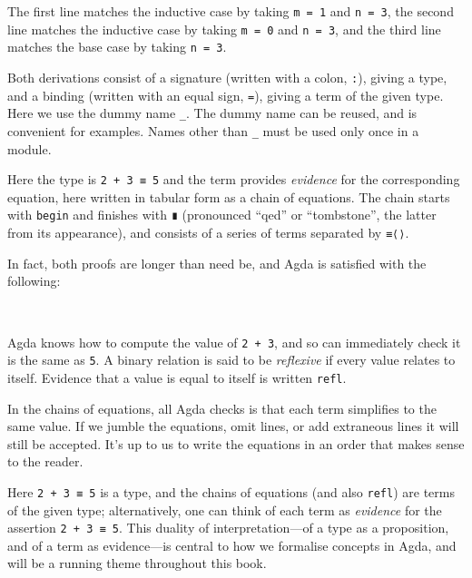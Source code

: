 The first line matches the inductive case by taking \texttt{m\ =\ 1} and
\texttt{n\ =\ 3}, the second line matches the inductive case by taking
\texttt{m\ =\ 0} and \texttt{n\ =\ 3}, and the third line matches the
base case by taking \texttt{n\ =\ 3}.

Both derivations consist of a signature (written with a colon,
\texttt{:}), giving a type, and a binding (written with an equal sign,
\texttt{=}), giving a term of the given type. Here we use the dummy name
\texttt{\_}. The dummy name can be reused, and is convenient for
examples. Names other than \texttt{\_} must be used only once in a
module.

Here the type is \texttt{2\ +\ 3\ ≡\ 5} and the term provides
\emph{evidence} for the corresponding equation, here written in tabular
form as a chain of equations. The chain starts with \texttt{begin} and
finishes with \texttt{∎} (pronounced ``qed'' or ``tombstone'', the
latter from its appearance), and consists of a series of terms separated
by \texttt{≡⟨⟩}.

In fact, both proofs are longer than need be, and Agda is satisfied with
the following:

\begin{fence}
\begin{code}%
\>[0]\AgdaFunction{\AgdaUnderscore{}}\AgdaSpace{}%
\AgdaSymbol{:}\AgdaSpace{}%
\AgdaSpace{}%
\AgdaOperator{\AgdaFunction{+}}\AgdaSpace{}%
\AgdaSpace{}%
\AgdaSpace{}%
\<%
\\
\>[0]\AgdaSymbol{\AgdaUnderscore{}}\AgdaSpace{}%
\AgdaSymbol{=}\AgdaSpace{}%
\<%
\end{code}
\end{fence}

Agda knows how to compute the value of \texttt{2\ +\ 3}, and so can
immediately check it is the same as \texttt{5}. A binary relation is
said to be \emph{reflexive} if every value relates to itself. Evidence
that a value is equal to itself is written \texttt{refl}.

In the chains of equations, all Agda checks is that each term simplifies
to the same value. If we jumble the equations, omit lines, or add
extraneous lines it will still be accepted. It's up to us to write the
equations in an order that makes sense to the reader.

Here \texttt{2\ +\ 3\ ≡\ 5} is a type, and the chains of equations (and
also \texttt{refl}) are terms of the given type; alternatively, one can
think of each term as \emph{evidence} for the assertion
\texttt{2\ +\ 3\ ≡\ 5}. This duality of interpretation---of a type as a
proposition, and of a term as evidence---is central to how we formalise
concepts in Agda, and will be a running theme throughout this book.

